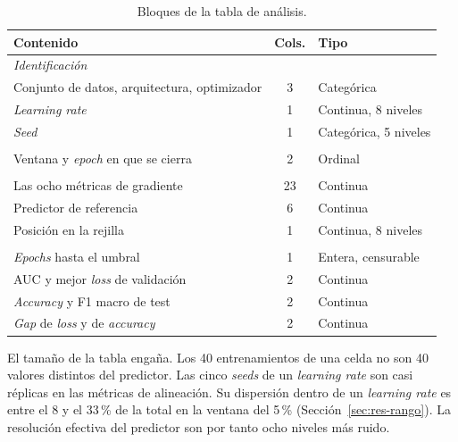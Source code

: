 \begin{table}[ht]
\centering
\small
\setlength{\tabcolsep}{4pt}
\caption{Bloques de la tabla de análisis.}
\label{tab:tabla-analisis}
\begin{tabular}{lcl}
\toprule
\textbf{Contenido} & \textbf{Cols.} & \textbf{Tipo} \\
\midrule
\multicolumn{3}{l}{\itshape Identificación} \\
\addlinespace[2pt]
Conjunto de datos, arquitectura, optimizador & 3 & Categórica \\
\emph{Learning rate}                         & 1 & Continua, 8 niveles \\
\emph{Seed}                                  & 1 & Categórica, 5 niveles \\
\addlinespace[3pt]
\multicolumn{3}{l}{\itshape Posición} \\
\addlinespace[2pt]
Ventana y \emph{epoch} en que se cierra      & 2 & Ordinal \\
\addlinespace[3pt]
\multicolumn{3}{l}{\itshape Predictoras} \\
\addlinespace[2pt]
Las ocho métricas de gradiente               & 23 & Continua \\
Predictor de referencia                      & 6 & Continua \\
Posición en la rejilla                       & 1 & Continua, 8 niveles \\
\addlinespace[3pt]
\multicolumn{3}{l}{\itshape Dependientes} \\
\addlinespace[2pt]
\emph{Epochs} hasta el umbral                & 1 & Entera, censurable \\
AUC y mejor \emph{loss} de validación        & 2 & Continua \\
\emph{Accuracy} y F1 macro de test           & 2 & Continua \\
\emph{Gap} de \emph{loss} y de \emph{accuracy} & 2 & Continua \\
\bottomrule
\end{tabular}
\end{table}

El tamaño de la tabla engaña. Los 40 entrenamientos de una celda no son 40 valores distintos del predictor. Las cinco \emph{seeds} de un \emph{learning rate} son casi réplicas en las métricas de alineación. Su dispersión dentro de un \emph{learning rate} es entre el 8 y el 33\,\% de la total en la ventana del 5\,\% (Sección~\ref{sec:res-rango}). La resolución efectiva del predictor son por tanto ocho niveles más ruido.

